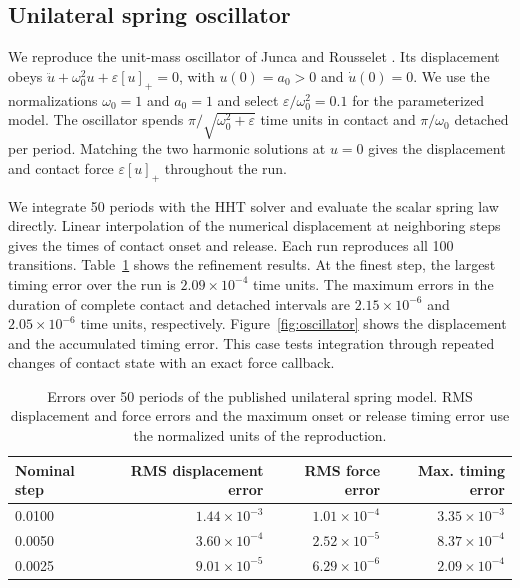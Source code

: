 \subsection{Unilateral spring oscillator}
\label{sec:oscillator}
We reproduce the unit-mass oscillator of Junca and Rousselet \citep[Sec.~2]{junca2009}. Its displacement obeys $\ddot u+\omega_0^2 u+\varepsilon[u]_+=0$, with $u(0)=a_0>0$ and $\dot u(0)=0$. We use the normalizations $\omega_0=1$ and $a_0=1$ and select $\varepsilon/\omega_0^2=0.1$ for the parameterized model. The oscillator spends $\pi/\sqrt{\omega_0^2+\varepsilon}$ time units in contact and $\pi/\omega_0$ detached per period. Matching the two harmonic solutions at $u=0$ gives the displacement and contact force $\varepsilon[u]_+$ throughout the run.

We integrate 50 periods with the HHT solver and evaluate the scalar spring law directly. Linear interpolation of the numerical displacement at neighboring steps gives the times of contact onset and release. Each run reproduces all 100 transitions. Table~\ref{tab:oscillator} shows the refinement results. At the finest step, the largest timing error over the run is $2.09\times10^{-4}$ time units. The maximum errors in the duration of complete contact and detached intervals are $2.15\times10^{-6}$ and $2.05\times10^{-6}$ time units, respectively. Figure~\ref{fig:oscillator} shows the displacement and the accumulated timing error. This case tests integration through repeated changes of contact state with an exact force callback.

\begin{table}[pos=!htbp]
\centering\small
\caption{Errors over 50 periods of the published unilateral spring model. RMS displacement and force errors and the maximum onset or release timing error use the normalized units of the reproduction.}
\label{tab:oscillator}
\begin{tabular}{lrrr}\toprule
Nominal step & RMS displacement error & RMS force error & Max. timing error \\\midrule
0.0100 & $1.44\times10^{-3}$ & $1.01\times10^{-4}$ & $3.35\times10^{-3}$ \\
0.0050 & $3.60\times10^{-4}$ & $2.52\times10^{-5}$ & $8.37\times10^{-4}$ \\
0.0025 & $9.01\times10^{-5}$ & $6.29\times10^{-6}$ & $2.09\times10^{-4}$ \\
\bottomrule\end{tabular}
\end{table}

